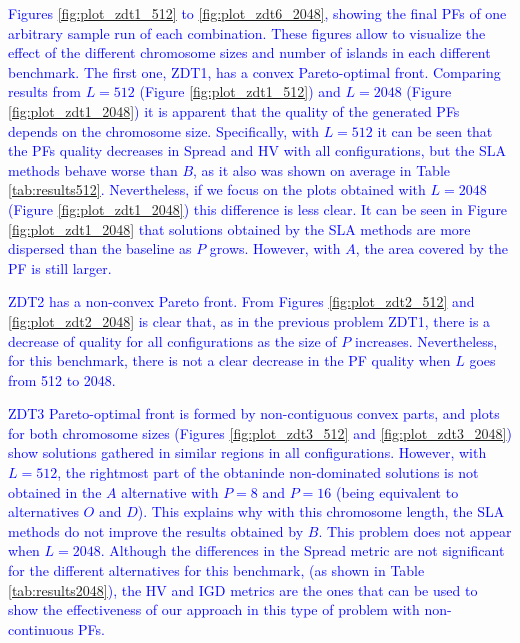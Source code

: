 \documentclass[preprint]{elsarticle}
\begin{document}
\textcolor{blue}{Figures \ref{fig:plot_zdt1_512} to \ref{fig:plot_zdt6_2048}, showing the final PFs of one arbitrary sample run of each combination. These figures allow to visualize the effect of the different chromosome sizes and number of islands in each different benchmark. The first one, ZDT1, has a convex Pareto-optimal front. Comparing results from $L=512$ (Figure \ref{fig:plot_zdt1_512}) and $L=2048$ (Figure \ref{fig:plot_zdt1_2048}) it is apparent that the quality of the generated PFs depends on the chromosome size. Specifically, with $L=512$ it can be seen that the PFs quality decreases in Spread and HV with all configurations, but the SLA methods behave worse than $B$, as it also was shown on average in Table \ref{tab:results512}. Nevertheless, if we focus on the plots obtained with $L=2048$ (Figure \ref{fig:plot_zdt1_2048}) this difference is less clear. It can be seen in Figure \ref{fig:plot_zdt1_2048} that solutions obtained by the SLA methods are more dispersed than the baseline as $P$ grows. However, with $A$, the area covered by the PF is still larger.}

\textcolor{blue}{ZDT2 has a non-convex Pareto front. From Figures \ref{fig:plot_zdt2_512} and \ref{fig:plot_zdt2_2048} is clear that, as in the previous problem ZDT1, there is a decrease of quality for all configurations as the size of $P$ increases.  Nevertheless, for this benchmark, there is not a clear decrease in the PF quality when $L$ goes from 512 to 2048.}

\textcolor{blue}{ZDT3 Pareto-optimal front is formed by non-contiguous convex parts, and plots for both chromosome sizes (Figures \ref{fig:plot_zdt3_512} and \ref{fig:plot_zdt3_2048}) show solutions gathered in similar regions in all configurations. However, with $L=512$, the rightmost part of the obtaninde non-dominated solutions is not obtained in the $A$ alternative with $P=8$  and $P=16$ (being equivalent to alternatives $O$ and $D$). This explains why with this chromosome length, the SLA methods do not improve the results obtained by $B$. This problem does not appear when $L=2048$. Although the differences in the Spread metric are not significant for the different alternatives for this benchmark, (as shown in Table \ref{tab:results2048}), the HV and IGD metrics are the ones that can be used to show the effectiveness of our approach in this type of problem with non-continuous PFs.} 
\end{document}
